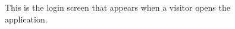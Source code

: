 \documentclass[12pt,titlepage]{article}
\begin{document}
\begin{figure}
\centering
{}
\caption{This is the login screen that appears when a visitor opens the application.}
\end{figure}
\end{document}
